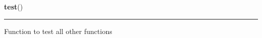    \label{main:test}

    \vspace{0.5ex}

\hspace{.8\funcindent}\begin{boxedminipage}{\funcwidth}

    \raggedright \textbf{test}()

    \vspace{-1.5ex}

    \rule{\textwidth}{0.5\fboxrule}
\setlength{\parskip}{2ex}
    Function to test all other functions

\setlength{\parskip}{1ex}
    \end{boxedminipage}

